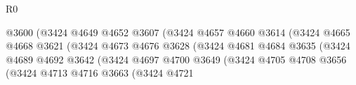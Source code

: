 \begin{lexlean}{R0}
\begin{coremodule}
                                                    @3600
                                                    (@3424
                                                      @4649
                                                      @4652
                                                      @3607
                                                      (@3424
                                                        @4657
                                                        @4660
                                                        @3614
                                                        (@3424
                                                          @4665
                                                          @4668
                                                          @3621
                                                          (@3424
                                                            @4673
                                                            @4676
                                                            @3628
                                                            (@3424
                                                              @4681
                                                              @4684
                                                              @3635
                                                              (@3424
                                                                @4689
                                                                @4692
                                                                @3642
                                                                (@3424
                                                                  @4697
                                                                  @4700
                                                                  @3649
                                                                  (@3424
                                                                    @4705
                                                                    @4708
                                                                    @3656
                                                                    (@3424
                                                                      @4713
                                                                      @4716
                                                                      @3663
                                                                      (@3424
                                                                        @4721

\end{coremodule}
\end{lexlean}
